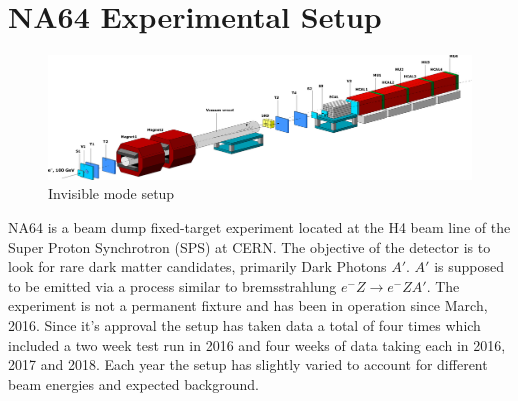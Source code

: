 
\chapter{NA64 Experimental Setup}
\label{sec:setup}
\begin{figure}[h!]
\centering
\includegraphics[width=\textwidth]{thesis_figures/Invisible_3d_setup.png}
\caption{Invisible mode setup~\cite{Banerjee:2016tad}}
\label{fig:Invisible_mode_setup}
\end{figure}

NA64 is a beam dump fixed-target experiment located at the H4 beam line of the Super Proton Synchrotron (SPS) at CERN. The objective of the detector is to look for rare dark matter candidates, primarily Dark Photons $A'$. $A'$ is supposed to be emitted via a process similar to bremsstrahlung $e^-Z\rightarrow e^- Z A'$. The experiment is not a permanent fixture and has been in operation since March, 2016. Since it's approval the setup has taken data a total of four times which included a two week test run in 2016 and four weeks of data taking each in 2016, 2017 and 2018. Each year the setup has slightly varied to account for different beam energies and expected background.

